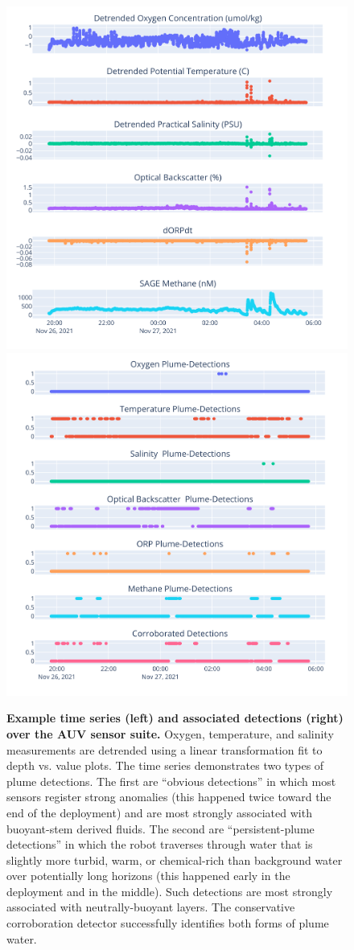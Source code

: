 \begin{figure} [h]
    \centering
    \includegraphics[width=0.45\columnwidth]{figures/binary_example_time.png}
    \hspace{.1in}
    \includegraphics[width=0.45\columnwidth]{figures/binary_example_detections.png}
    \caption{\textbf{Example time series (left) and associated detections (right) over the AUV \Sentry sensor suite.} Oxygen, temperature, and salinity measurements are detrended using a linear transformation fit to depth vs. value plots. The time series demonstrates two types of plume detections. The first are ``obvious detections'' in which most sensors register strong anomalies (this happened twice toward the end of the deployment) and are most strongly associated with buoyant-stem derived fluids. The second are ``persistent-plume detections'' in which the robot traverses through water that is slightly more turbid, warm, or chemical-rich than background water over potentially long horizons (this happened early in the deployment and in the middle). Such detections are most strongly associated with neutrally-buoyant layers. The conservative corroboration detector successfully identifies both forms of plume water.}
    \label{fig:detection_example}
\end{figure}

